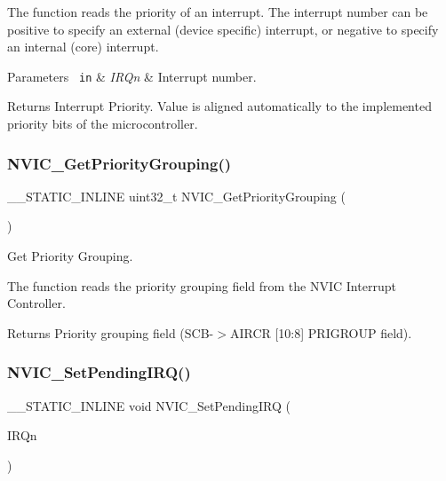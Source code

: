 The function reads the priority of an interrupt. The interrupt number can be positive to specify an external (device specific) interrupt, or negative to specify an internal (core) interrupt.


\begin{DoxyParams}[1]{Parameters}
\mbox{\texttt{ in}}  & {\em I\+R\+Qn} & Interrupt number. \\
\hline
\end{DoxyParams}
\begin{DoxyReturn}{Returns}
Interrupt Priority. Value is aligned automatically to the implemented priority bits of the microcontroller. 
\end{DoxyReturn}
\mbox{\label{group___c_m_s_i_s___core___n_v_i_c_functions_ga394f7ce2ca826c0da26284d17ac6524d}} 
\subsubsection{\texorpdfstring{NVIC\_GetPriorityGrouping()}{NVIC\_GetPriorityGrouping()}}
{\footnotesize\ttfamily \+\_\+\+\_\+\+S\+T\+A\+T\+I\+C\+\_\+\+I\+N\+L\+I\+NE uint32\+\_\+t N\+V\+I\+C\+\_\+\+Get\+Priority\+Grouping (\begin{DoxyParamCaption}\item[{void}]{ }\end{DoxyParamCaption})}



Get Priority Grouping. 

The function reads the priority grouping field from the N\+V\+IC Interrupt Controller.

\begin{DoxyReturn}{Returns}
Priority grouping field (S\+C\+B-\/$>$A\+I\+R\+CR \mbox{[}10\+:8\mbox{]} P\+R\+I\+G\+R\+O\+UP field). 
\end{DoxyReturn}
\mbox{\label{group___c_m_s_i_s___core___n_v_i_c_functions_ga3ecf446519da33e1690deffbf5be505f}} 
\subsubsection{\texorpdfstring{NVIC\_SetPendingIRQ()}{NVIC\_SetPendingIRQ()}}
{\footnotesize\ttfamily \+\_\+\+\_\+\+S\+T\+A\+T\+I\+C\+\_\+\+I\+N\+L\+I\+NE void N\+V\+I\+C\+\_\+\+Set\+Pending\+I\+RQ (\begin{DoxyParamCaption}\item[{\mbox{\hyperlink{group___configuration__section__for___c_m_s_i_s_gac3af4a32370fb28c4ade8bf2add80251}{I\+R\+Qn\+\_\+\+Type}}}]{I\+R\+Qn }\end{DoxyParamCaption})}



